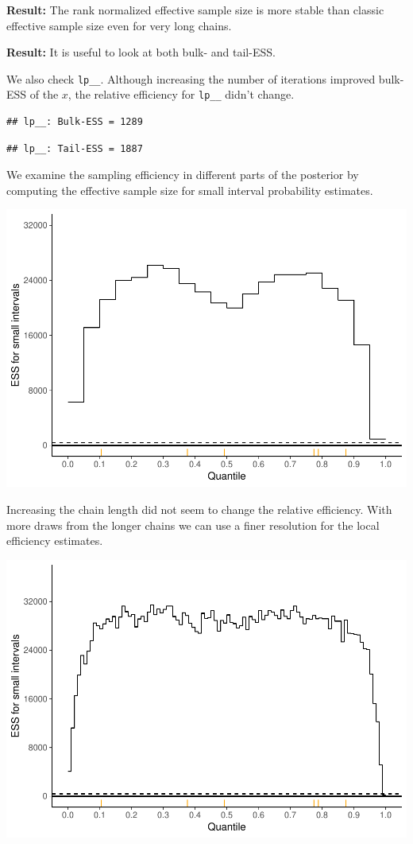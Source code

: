 \documentclass[american,]{article}
\begin{document}
\textbf{Result:} The rank normalized effective sample size is more
stable than classic effective sample size even for very long chains.

\textbf{Result:} It is useful to look at both bulk- and tail-ESS.

We also check \texttt{lp\_\_}. Although increasing the number of
iterations improved bulk-ESS of the \(x\), the relative efficiency for
\texttt{lp\_\_} didn't change.

\begin{verbatim}
## lp__: Bulk-ESS = 1289
\end{verbatim}

\begin{verbatim}
## lp__: Tail-ESS = 1887
\end{verbatim}

We examine the sampling efficiency in different parts of the posterior
by computing the effective sample size for small interval probability
estimates.

\includegraphics{graphics/local-ess-fit-nom-td20l-1.pdf}

Increasing the chain length did not seem to change the relative
efficiency. With more draws from the longer chains we can use a finer
resolution for the local efficiency estimates.

\includegraphics{graphics/local-ess-fit-nom-td20l-finer-1.pdf}
\end{document}
